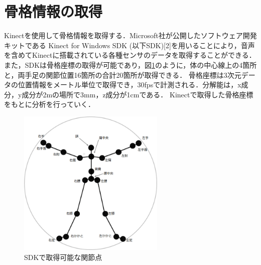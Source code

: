 \section{骨格情報の取得}
Kinectを使用して骨格情報を取得する．Microsoft社が公開したソフトウェア開発キットである
Kinect for Windows SDK (以下SDK)[2]を用いることにより，音声を含めてKinectに搭載されている各種センサのデータを取得することができる．
また，SDKは骨格座標の取得が可能であり，図\ref{fig:kokkaku}のように，体の中心線上の4箇所と，両手足の関節位置16箇所の合計20箇所が取得できる．
骨格座標は3次元データの位置情報をメートル単位で取得でき，30fpsで計測される．分解能は，x成分，y成分が2mの場所で3mm，z成分が1cmである．
Kinectで取得した骨格座標をもとに分析を行っていく．
\begin{figure}[htbp]
  \begin{center}
    \includegraphics[clip,width=7.0cm]{./images/kokkaku.png}
    \caption{SDKで取得可能な関節点}
    \label{fig:kokkaku}
  \end{center}
\end{figure}